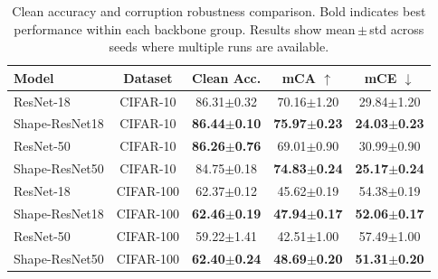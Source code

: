 \begin{table}[htbp]
\caption{Clean accuracy and corruption robustness comparison. Bold indicates best performance within each backbone group. Results show mean\,$\pm$\,std across seeds where multiple runs are available.}
\begin{center}
\begin{tabular}{|l|c|c|c|c|}
\hline
\textbf{Model} & \textbf{Dataset} & \textbf{Clean Acc.} & \textbf{mCA $\uparrow$} & \textbf{mCE $\downarrow$} \\
\hline
ResNet-18 & CIFAR-10 & 86.31$\pm$0.32 & 70.16$\pm$1.20 & 29.84$\pm$1.20 \\
Shape-ResNet18 & CIFAR-10 & \textbf{86.44$\pm$0.10} & \textbf{75.97$\pm$0.23} & \textbf{24.03$\pm$0.23} \\
\hline
ResNet-50 & CIFAR-10 & \textbf{86.26$\pm$0.76} & 69.01$\pm$0.90 & 30.99$\pm$0.90 \\
Shape-ResNet50 & CIFAR-10 & 84.75$\pm$0.18 & \textbf{74.83$\pm$0.24} & \textbf{25.17$\pm$0.24} \\
\hline
ResNet-18 & CIFAR-100 & 62.37$\pm$0.12 & 45.62$\pm$0.19 & 54.38$\pm$0.19 \\
Shape-ResNet18 & CIFAR-100 & \textbf{62.46$\pm$0.19} & \textbf{47.94$\pm$0.17} & \textbf{52.06$\pm$0.17} \\
\hline
ResNet-50 & CIFAR-100 & 59.22$\pm$1.41 & 42.51$\pm$1.00 & 57.49$\pm$1.00 \\
Shape-ResNet50 & CIFAR-100 & \textbf{62.40$\pm$0.24} & \textbf{48.69$\pm$0.20} & \textbf{51.31$\pm$0.20} \\
\hline
\end{tabular}
\label{tab:main}
\end{center}
\end{table}